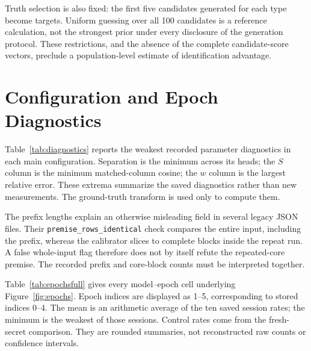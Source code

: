 Truth selection is also fixed: the first five candidates generated for each type become targets. Uniform guessing over all 100 candidates is a reference calculation, not the strongest prior under every disclosure of the generation protocol. These restrictions, and the absence of the complete candidate-score vectors, preclude a population-level estimate of identification advantage.

\section{Configuration and Epoch Diagnostics}
\label{app:diagnostics}
Table~\ref{tab:diagnostics} reports the weakest recorded parameter diagnostics in each main configuration. Separation is the minimum across its heads; the $S$ column is the minimum matched-column cosine; the $w$ column is the largest relative error. These extrema summarize the saved diagnostics rather than new measurements. The ground-truth transform is used only to compute them.

\begin{table}[t]
\centering
\caption{Main-suite calibration diagnostics derived from saved head records. Prefix is the number of leading tokens before the repeat run; core blocks exclude prefix-containing and incomplete blocks. All heads record $b$ clusters.}
\label{tab:diagnostics}

\end{table}

The prefix lengths explain an otherwise misleading field in several legacy JSON files. Their \texttt{premise\_rows\_identical} check compares the entire input, including the prefix, whereas the calibrator slices to complete blocks inside the repeat run. A false whole-input flag therefore does not by itself refute the repeated-core premise. The recorded prefix and core-block counts must be interpreted together.

Table~\ref{tab:epochsfull} gives every model--epoch cell underlying Figure~\ref{fig:epochs}. Epoch indices are displayed as 1--5, corresponding to stored indices 0--4. The mean is an arithmetic average of the ten saved session rates; the minimum is the weakest of those sessions. Control rates come from the fresh-secret comparison. They are rounded summaries, not reconstructed raw counts or confidence intervals.

\begin{table}[t]
\centering
\caption{All 15 recorded model--epoch cells. Every head calibrates. Recovery columns summarize the same ten reused sessions per model; control rates are reported separately. Percentages inherit the precision of the saved records.}
\label{tab:epochsfull}

\end{table}

